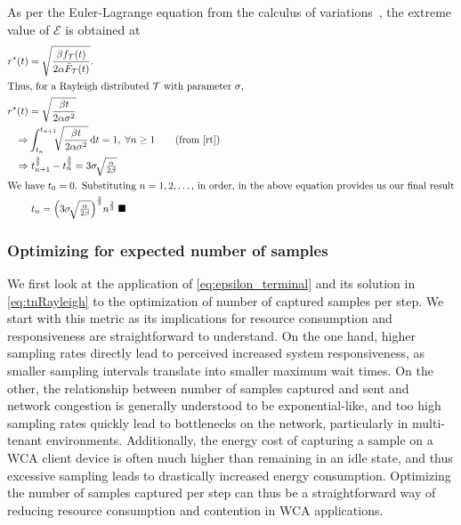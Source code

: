 As per the Euler-Lagrange equation from the calculus of variations~\cite{bellman1954dynamic,arfken2013calculus}, the extreme value of $\mathcal{E}$ is obtained at
\begin{alignat}{1}
r^*(t)&=\sqrt{\dfrac{\beta f_\mathcal{T}(t)}{2\alpha\bar{F}_\mathcal{T}(t)}}.\\
\intertext{Thus, for a Rayleigh distributed $\mathcal{T}$ with parameter $\sigma$,}
r^*(t)&=\sqrt{\dfrac{\beta t}{2\alpha\sigma^2}}\\
\Rightarrow &\int_{t_n}^{t_{n+1}}\!\!\!\sqrt{\dfrac{\beta t}{2\alpha\sigma^2}}\,\mathrm{d}t=1,\;\forall n\geq1\nonumber\tag{from \eqref{rt}}\\
\Rightarrow &\;t_{n+1}^{\frac{3}{2}}-t_{n}^{\frac{3}{2}}=3\sigma\!\sqrt{\tfrac{\alpha}{2\beta}}\nonumber\\
\intertext{We have $t_0=0$. Substituting $n=1,2,\dots$, in order, in the above equation provides us our final result}
&\;t_n=\Big(3\sigma\!\sqrt{\tfrac{\alpha}{2\beta}}\Big)^{\frac{2}{3}}n^{\frac{2}{3}}\;\blacksquare\label{eq:tnRayleigh}
\end{alignat}


\subsubsection{Optimizing for expected number of samples}

We first look at the application of \cref{eq:epsilon_terminal} and its solution in \cref{eq:tnRayleigh} to the optimization of number of captured samples per step.
We start with this metric as its implications for resource consumption and responsiveness are straightforward to understand.
On the one hand, higher sampling rates directly lead to perceived increased system responsiveness, as smaller sampling intervals translate into smaller maximum wait times.
On the other, the relationship between number of samples captured and sent and network congestion is generally understood to be exponential-like, and too high sampling rates quickly lead to bottlenecks on the network, particularly in multi-tenant environments.
Additionally, the energy cost of capturing a sample on a \gls{WCA} client device is often much higher than remaining in an idle state, and thus excessive sampling leads to drastically increased energy consumption.
Optimizing the number of samples captured per step can thus be a straightforward way of reducing resource consumption and contention in \gls{WCA} applications.

